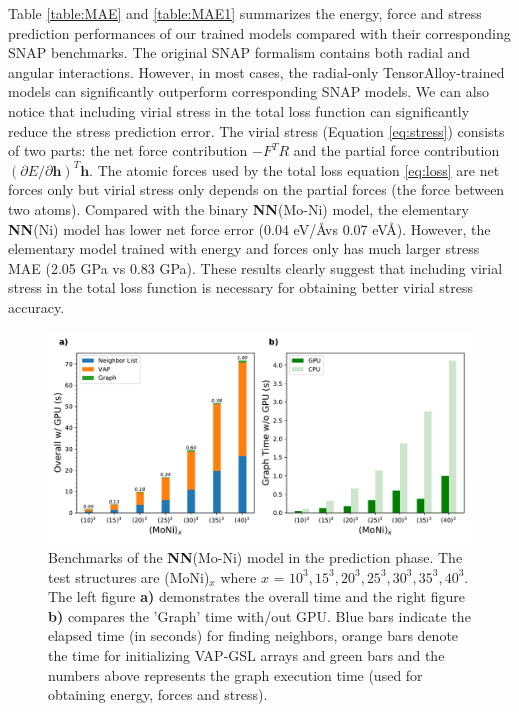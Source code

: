 \documentclass[final,1p,times]{elsarticle}
\begin{document}
Table \ref{table:MAE} and \ref{table:MAE1} summarizes the energy, force and 
stress prediction performances of our trained models compared with their 
corresponding SNAP benchmarks. 
The original SNAP formalism contains both radial and angular 
interactions. However, in most cases, the radial-only TensorAlloy-trained 
models can significantly outperform corresponding SNAP models. We can also 
notice that including virial stress in the total loss function can significantly
reduce the stress prediction error. The virial stress 
(Equation \ref{eq:stress}) consists of two parts: the net force contribution 
$-F^TR$ and the partial force contribution 
$\left(\partial E / \partial \mathbf{h}\right)^T\mathbf{h}$. The atomic forces 
used by the total loss equation \ref{eq:loss} are net forces only but virial 
stress only depends on the partial forces (the force between two atoms). 
Compared with the binary \textbf{NN}(Mo-Ni) model, the elementary 
\textbf{NN}(Ni) model has lower net force error (0.04 eV/\AA vs 0.07 eV\AA). 
However, the elementary model trained with energy and forces only has much 
larger stress MAE (2.05 GPa vs 0.83 GPa). These results clearly suggest that 
including virial stress in the total loss function is necessary for obtaining 
better virial stress accuracy.

% 
%
\begin{figure}[h!]
    \centering
    \includegraphics[scale=0.5]{figures/Prediction-speed.pdf}
\caption{\label{fig:prediction_speed} Benchmarks of the \textbf{NN}(Mo-Ni) model 
in the prediction phase. The test structures are (MoNi)$_{x}$ where 
$x$ = $10^3, 15^3, 20^3, 25^3, 30^3, 35^3, 40^3$. The left figure \textbf{a)} 
demonstrates the overall time and the right figure \textbf{b)} compares the 
'Graph' time with/out GPU. Blue bars indicate the elapsed time (in seconds) for 
finding neighbors, orange bars denote the time for initializing VAP-GSL arrays 
and green bars and the numbers above represents the graph execution time (used 
for obtaining energy, forces and stress).
}
\end{figure}
\end{document}
